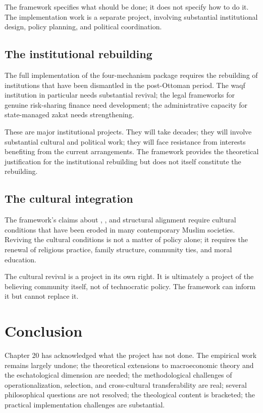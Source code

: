 The framework specifies what should be done; it does not specify
how to do it. The implementation work is a separate project,
involving substantial institutional design, policy planning, and
political coordination.

\subsection{The institutional rebuilding}

The full implementation of the four-mechanism package requires
the rebuilding of institutions that have been dismantled in the
post-Ottoman period. The waqf institution in particular needs
substantial revival; the legal frameworks for genuine
risk-sharing finance need development; the administrative
capacity for state-managed zakat needs strengthening.

These are major institutional projects. They will take decades;
they will involve substantial cultural and political work; they
will face resistance from interests benefiting from the current
arrangements. The framework provides the theoretical
justification for the institutional rebuilding but does not itself
constitute the rebuilding.

\subsection{The cultural integration}

The framework's claims about , , and
structural alignment require cultural conditions that have been
eroded in many contemporary Muslim societies. Reviving the
cultural conditions is not a matter of policy alone; it requires
the renewal of religious practice, family structure, community
ties, and moral education.

The cultural revival is a project in its own right. It is
ultimately a project of the believing community itself, not of
technocratic policy. The framework can inform it but cannot
replace it.

\section{Conclusion}
\label{sec:open-conclusion}

Chapter 20 has acknowledged what the project has not done. The
empirical work remains largely undone; the theoretical
extensions to macroeconomic theory and the eschatological
dimension are needed; the methodological challenges of
operationalization, selection, and cross-cultural transferability
are real; several philosophical questions are not resolved; the
theological content is bracketed; the practical implementation
challenges are substantial.

